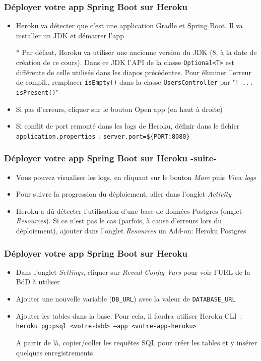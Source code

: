 \documentclass{beamer}
\begin{document}
\begin{frame}
\frametitle{Déployer votre app Spring Boot sur Heroku}
\begin{itemize}
		\item Heroku va détecter que c'est une application Gradle et Spring Boot. Il va installer un JDK et démarrer l'app
		\item[*] Par défaut, Heroku va utiliser une ancienne version du JDK (8, à la date de création de ce cours). Dans ce JDK l'API de la classe \texttt{Optional<T>} est différente de celle utilisée dans les diapos précédentes. Pour éliminer l'erreur de compil., remplacer \texttt{isEmpty()} dans la classe \texttt{UsersController} par "\texttt{! ... isPresent()}"
		\item Si pas d'erreurs, cliquer sur le bouton Open app (en haut à droite) 
		\item Si conflit de port remonté dans les logs de Heroku, définir dans le fichier \texttt{application.properties}~:
		\texttt{server.port=\$\{PORT:8080\}}
\end{itemize}
\end{frame} 

\begin{frame}
\frametitle{Déployer votre app Spring Boot sur Heroku -suite-}
\begin{itemize}
		\item Vous pouvez visualiser les logs, en cliquant sur le bouton \textit{More} puis \textit{View logs}
		\item Pour suivre la progression du déploiement, aller dans l'onglet \textit{Activity}
		\item Heroku a dû détecter l'utilisation d'une base de données Postgres (onglet \textit{Resources}). Si ce n'est pas le cas (parfois, à cause d'erreurs lors du déploiement), ajouter dans l'onglet \textit{Resources} un Add-on: Heroku Postgres
\end{itemize}
\end{frame} 

\begin{frame}
\frametitle{Déployer votre app Spring Boot sur Heroku}
\begin{itemize}		
		\item Dans l'onglet \textit{Settings}, cliquer sur \textit{Reveal Config Vars} pour voir l'URL de la BdD à utiliser
		\item Ajouter une nouvelle variable (\texttt{DB\_URL}) avec la valeur de \texttt{DATABASE\_URL}
		
		\item Ajouter les tables dans la base. Pour cela, il faudra utiliser Heroku CLI~:\\
		\texttt{heroku pg:psql <votre-bdd> --app <votre-app-heroku>}
		\item[] A partir de là, copier/coller les requêtes SQL pour créer les tables et y insérer quelques enregistrements
\end{itemize}
\end{frame} 
\end{document}
